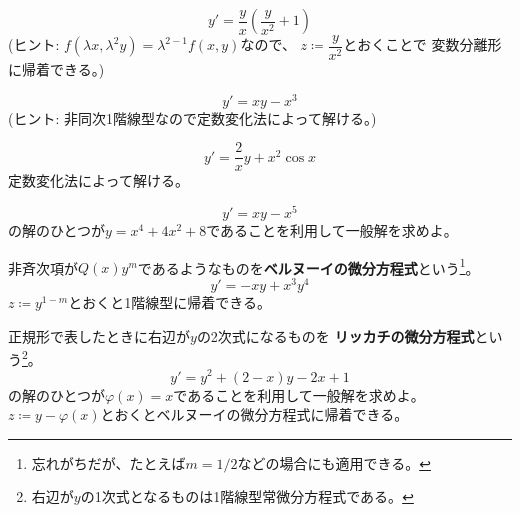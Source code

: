 \documentclass[report]{jlreq}
\begin{document}
\begin{problem}[2.2.4 同次形の一般化]
    \begin{equation}
        y' = \frac{y}{x} \left(\frac{y}{x^2} + 1\right)
    \end{equation}
    (ヒント: $f(\lambda x, \lambda^2 y) = \lambda^{2-1} f(x, y)$なので、
    $z \coloneqq \dfrac{y}{x^2}$とおくことで
    変数分離形に帰着できる。)
\end{problem}

\begin{problem}[2.3.1]
    \begin{equation}
        y' = xy - x^3
    \end{equation}
    (ヒント: 非同次1階線型なので定数変化法によって解ける。)
\end{problem}

\begin{problem}[2.3.2]
    \begin{equation}
        y' = \frac{2}{x} y + x^2 \cos x
    \end{equation}
    定数変化法によって解ける。
\end{problem}

\begin{problem}[2.3.3]
    \begin{equation}
        y' = xy - x^5
    \end{equation}
    の解のひとつが$y = x^4 + 4x^2 + 8$であることを利用して一般解を求めよ。
\end{problem}

\begin{problem}[2.3.4]
    非斉次項が$Q(x) y^m$であるようなものを\textbf{ベルヌーイの微分方程式}という\footnote{
        忘れがちだが、たとえば$m = 1/2$などの場合にも適用できる。
    }。
    \begin{equation}
        y' = -xy + x^3 y^4
    \end{equation}
    $z \coloneqq y^{1-m}$とおくと1階線型に帰着できる。
\end{problem}

\begin{problem}[2.3.5]
    正規形で表したときに右辺が$y$の2次式になるものを
    \textbf{リッカチの微分方程式}という\footnote{
        右辺が$y$の1次式となるものは1階線型常微分方程式である。
    }。
    \begin{equation}
        y' = y^2 + (2-x) y - 2x + 1
    \end{equation}
    の解のひとつが$\varphi(x) = x$であることを利用して一般解を求めよ。
    $z \coloneqq y - \varphi(x)$とおくとベルヌーイの微分方程式に帰着できる。
\end{problem}
\end{document}
